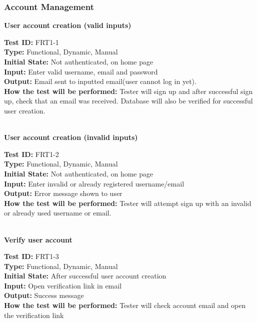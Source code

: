 \documentclass[12pt,fleqn]{article}
\begin{document}
\subsubsection{Account Management}

\textbf{User account creation (valid inputs)}
\begin{tcolorbox}
\textbf{Test ID:} FRT1-1\\
\textbf{Type:} Functional, Dynamic, Manual\\
\textbf{Initial State:} Not authenticated, on home page\\
\textbf{Input:} Enter valid username, email and password\\
\textbf{Output:} Email sent to inputted email(user cannot log in yet). \\
\textbf{How the test will be performed:} Tester will sign up and after successful sign up, check that an email was received. Database will also be verified for successful user creation.
\end{tcolorbox}

\textbf{\\User account creation (invalid inputs)}
\begin{tcolorbox}
\textbf{Test ID:} FRT1-2\\
\textbf{Type:} Functional, Dynamic, Manual\\
\textbf{Initial State:} Not authenticated, on home page\\
\textbf{Input:} Enter invalid or already registered username/email\\
\textbf{Output:} Error message shown to user\\
\textbf{How the test will be performed:} Tester will attempt sign up with an invalid or already used username or email.
\end{tcolorbox}

\textbf{\\Verify user account}
\begin{tcolorbox}
\textbf{Test ID:} FRT1-3\\
\textbf{Type:} Functional, Dynamic, Manual\\
\textbf{Initial State:} After successful user account creation\\
\textbf{Input:} Open verification link in email \\
\textbf{Output:} Success message \\
\textbf{How the test will be performed:} Tester will check account email and open the verification link
\end{tcolorbox}
\end{document}
